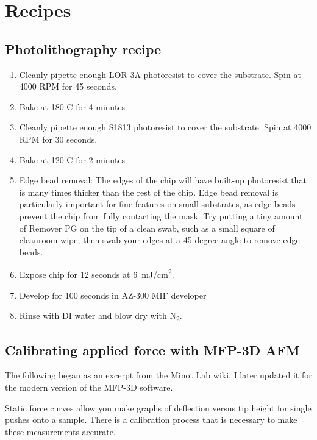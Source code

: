 \documentclass[double,12pt,1in,seploa]{beavtex}
\let\Oldsection\section
\renewcommand{\section}{\FloatBarrier\Oldsection}
\begin{document}
\pagebreak




\pagebreak

\appendix
\chapter{Recipes}

\section{Photolithography recipe} \label{photolithography recipe}

\begin{enumerate}
    \item Cleanly pipette enough LOR 3A photoresist to cover the substrate. Spin at 4000 RPM for 45 seconds.
    \item Bake at 180 C for 4 minutes
    \item Cleanly pipette enough S1813 photoresist to cover the substrate. Spin at 4000 RPM for 30 seconds.
    \item Bake at 120 C for 2 minutes
    \item Edge bead removal: The edges of the chip will have built-up photoresist that is many times thicker than the rest of the chip. Edge bead removal is particularly important for fine features on small substrates, as edge beads prevent the chip from fully contacting the mask. Try putting a tiny amount of Remover PG on the tip of a clean swab, such as a small square of cleanroom wipe, then swab your edges at a 45-degree angle to remove edge beads. 
    \item Expose chip for 12 seconds at \SI{6}{\milli\joule/\centi\meter^2}.
    \item Develop for 100 seconds in AZ-300 MIF developer
    \item Rinse with DI water and blow dry with N\textsubscript{2}.
\end{enumerate}


\section{Calibrating applied force with MFP-3D AFM} \label{force curve appendix}

The following began as an excerpt from the Minot Lab wiki. I later updated it for the modern version of the MFP-3D software.

Static force curves allow you make graphs of deflection versus tip height for single pushes onto a sample. There is a calibration process that is necessary to make these measurements accurate.
\end{document}
